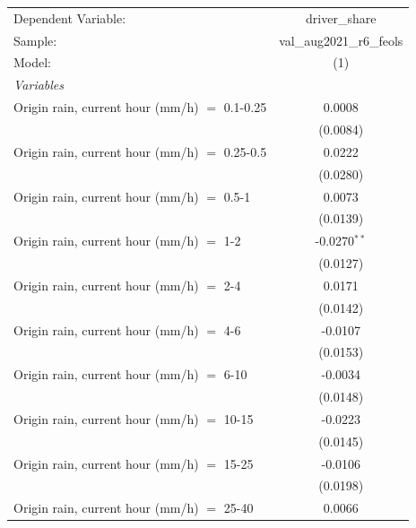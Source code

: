 \ifdefined\ifclassloaded
{}
\fi

\begingroup
\centering
\begin{tabular}{lc}
   \tabularnewline \midrule \midrule
   Dependent Variable:                           & driver\_share\\   
   Sample:                                       & val\_aug2021\_r6\_feols \\      
   Model:                                        & (1)\\  
   \midrule
   \emph{Variables}\\
   Origin rain, current hour (mm/h) $=$ 0.1-0.25 & 0.0008\\   
                                                 & (0.0084)\\   
   Origin rain, current hour (mm/h) $=$ 0.25-0.5 & 0.0222\\   
                                                 & (0.0280)\\   
   Origin rain, current hour (mm/h) $=$ 0.5-1    & 0.0073\\   
                                                 & (0.0139)\\   
   Origin rain, current hour (mm/h) $=$ 1-2      & -0.0270$^{**}$\\   
                                                 & (0.0127)\\   
   Origin rain, current hour (mm/h) $=$ 2-4      & 0.0171\\   
                                                 & (0.0142)\\   
   Origin rain, current hour (mm/h) $=$ 4-6      & -0.0107\\   
                                                 & (0.0153)\\   
   Origin rain, current hour (mm/h) $=$ 6-10     & -0.0034\\   
                                                 & (0.0148)\\   
   Origin rain, current hour (mm/h) $=$ 10-15    & -0.0223\\   
                                                 & (0.0145)\\   
   Origin rain, current hour (mm/h) $=$ 15-25    & -0.0106\\   
                                                 & (0.0198)\\   
   Origin rain, current hour (mm/h) $=$ 25-40    & 0.0066\\   

\end{tabular}
